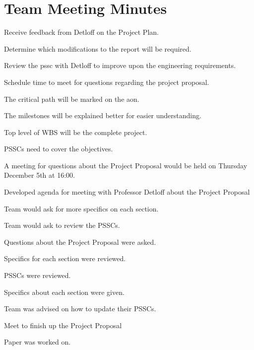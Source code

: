 \chapter{Team Meeting Minutes}
\minutesdetails
{
	\item Receive feedback from Detloff on the Project Plan.
	\item Determine which modifications to the report will be required.
	\item Review the \gls{pssc} with Detloff to improve upon the engineering requirements.
	\item Schedule time to meet for questions regarding the project proposal.}
{
	\item The critical path will be marked on the \gls{aon}.
	\item The milestones will be explained better for easier understanding. 
	\item Top level of WBS will be the complete project.
	\item PSSCs need to cover the objectives.
	\item A meeting for questions about the Project Proposal would be held on Thursday December 5th at 16:00.
}

\minutesdetails
{
	\item Developed agenda for meeting with Professor Detloff about the Project Proposal}
{
	\item Team would ask for more specifics on each section.
	\item Team would ask to review the PSSCs.
}

\minutesdetails
{
	\item Questions about the Project Proposal were asked. 
	\item Specifics for each section were reviewed.
	\item PSSCs were reviewed.}
{
	\item Specifics about each section were given.
	\item Team was advised on how to update their PSSCs.
}

\minutesdetails
{
	\item Meet to finish up the Project Proposal}
{
	\item Paper was worked on.
}

\signatures